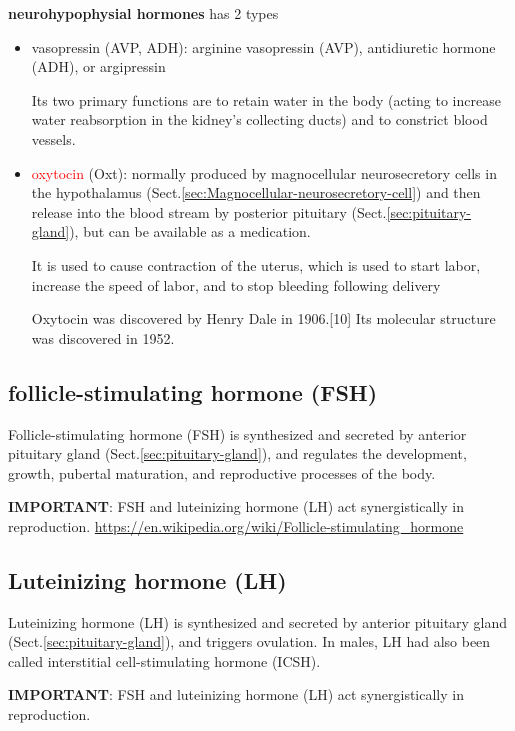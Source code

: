 {\bf neurohypophysial hormones} has 2 types
\begin{itemize}
  \item vasopressin (AVP, ADH):
  arginine vasopressin (AVP), antidiuretic hormone (ADH), or argipressin
  
  Its two primary functions are to retain water in the body (acting to increase
  water reabsorption in the kidney's collecting ducts) and to constrict blood
  vessels.
  
  \item  \textcolor{red}{oxytocin} (Oxt): normally produced by  magnocellular
  neurosecretory cells in the hypothalamus
  (Sect.\ref{sec:Magnocellular-neurosecretory-cell}) and then release into the
  blood stream by posterior pituitary (Sect.\ref{sec:pituitary-gland}), but can be available as a medication.
  
  
  It is used to cause contraction of the uterus, which is used to start labor,
  increase the speed of labor, and to stop bleeding following delivery
  
  Oxytocin was discovered by Henry Dale in 1906.[10] Its molecular structure was
  discovered in 1952.
\end{itemize}

\subsection{follicle-stimulating hormone (FSH)}
\label{sec:hormone-FSH}
\label{sec:FSH}

Follicle-stimulating hormone (FSH) is synthesized and secreted by anterior
pituitary gland (Sect.\ref{sec:pituitary-gland}), and regulates the development,
growth, pubertal maturation, and reproductive processes of the body.

{\bf IMPORTANT}: FSH and luteinizing hormone (LH) act synergistically in
reproduction.
\url{https://en.wikipedia.org/wiki/Follicle-stimulating_hormone}

\subsection{Luteinizing hormone (LH)}
\label{sec:luteinizing-hormone}
\label{sec:LH}


Luteinizing hormone (LH) is synthesized and secreted by anterior pituitary gland
(Sect.\ref{sec:pituitary-gland}), and triggers ovulation.   In males, LH
had also been called interstitial cell-stimulating hormone (ICSH).

{\bf IMPORTANT}: FSH and luteinizing hormone (LH) act synergistically in
reproduction.

